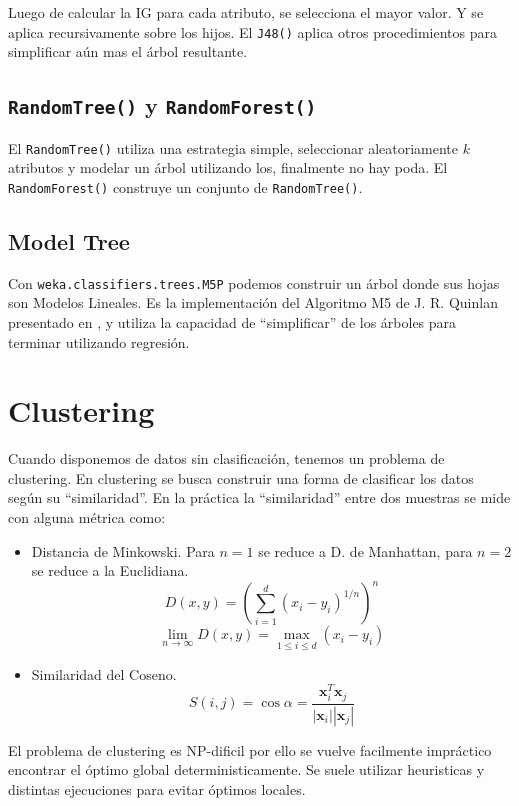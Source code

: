 \documentclass[10pt,a4paper]{article}
\begin{document}
Luego de calcular la IG para cada atributo, se selecciona el mayor valor. Y se aplica recursivamente sobre los hijos. El \lstinline{J48()} aplica otros procedimientos para simplificar aún mas el árbol resultante.

\subsection{\lstinline{RandomTree()} y \lstinline{RandomForest()}}
El \lstinline{RandomTree()} utiliza una estrategia simple, seleccionar aleatoriamente $k$ atributos y modelar un árbol utilizando los, finalmente no hay poda. El \lstinline{RandomForest()} construye un conjunto de \lstinline{RandomTree()}.


\subsection{Model Tree} \label{m5p}
Con \lstinline{weka.classifiers.trees.M5P} podemos construir un árbol donde sus hojas son Modelos Lineales. Es la implementación del Algoritmo M5 de J. R. Quinlan presentado en \cite{quinlan1992learning}, y utiliza la capacidad de ``simplificar'' de los árboles para terminar utilizando regresión.


\section{Clustering}
Cuando disponemos de datos sin clasificación, tenemos un problema de clustering. En clustering se busca construir una forma de clasificar los datos según su ``similaridad''. En la práctica la ``similaridad'' entre dos muestras se mide con alguna métrica \cite{xu2005survey} como:
\begin{itemize}
\item Distancia de Minkowski. Para $n=1$ se reduce a D. de Manhattan, para $n=2$ se reduce a la Euclidiana.
\[
D(x, y) = \left(\sum_{i=1}^d \left(x_i-y_i\right)^{1/n}\right)^n
\]
\[
\lim_{n \to \infty} D(x, y) = \max_{1 \leq i \leq d} \left( x_i - y_i \right)
\]
\item Similaridad del Coseno.
  \[
  S(i, j) = \cos \alpha = \frac{\boldsymbol{x}_i^T\boldsymbol{x}_j}{|\boldsymbol{x}_i||\boldsymbol{x}_j|}
  \]
\end{itemize}

El problema de clustering es NP-dificil\cite{aloise2009np} por ello se vuelve facilmente impráctico encontrar el óptimo global deterministicamente. Se suele utilizar heuristicas y distintas ejecuciones para evitar óptimos locales.
\end{document}
